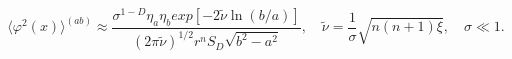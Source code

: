 \begin{equation}\label{phi2sigll1}
  \langle \varphi ^2(x)\rangle ^{(ab)}\approx
  \frac{\sigma ^{1-D}\eta _a\eta _b exp[-2\tilde \nu \ln (b/
  a)]}{(2\pi \tilde \nu )^{1/2}r^nS_D\sqrt{b^2-a^2}},\quad
  \tilde \nu =\frac{1}{\sigma }\sqrt{n(n+1)\xi },\quad \sigma \ll 1.
\end{equation}

